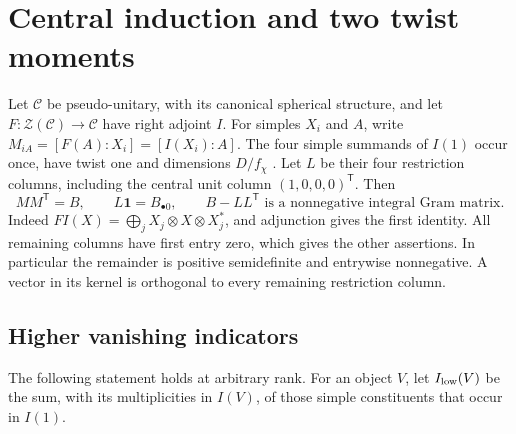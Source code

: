 \section{Central induction and two twist moments}\label{sec:finite-induction}
Let $\mathcal C$ be pseudo-unitary, with its canonical spherical structure,
and let $F:\mathcal Z(\mathcal C)\to\mathcal C$ have right adjoint $I$.
For simples $X_i$ and $A$, write
$M_{iA}=[F(A):X_i]=[I(X_i):A]$. The four simple summands of $I(1)$
occur once, have twist one and dimensions $D/f_\chi$
\cite[Theorems 2.5 and 2.13]{OstrikRank3}.
Let $L$ be their four restriction columns, including the central unit
column $(1,0,0,0)^{\mathsf T}$. Then
\begin{equation}\label{eq:induction-gram}
 MM^{\mathsf T}=B,\qquad
 L\mathbf1=B_{\bullet0},\qquad
 B-LL^{\mathsf T}\text{ is a nonnegative integral Gram matrix}.
\end{equation}
Indeed $FI(X)=\bigoplus_j X_j\otimes X\otimes X_j^*$, and adjunction
gives the first identity. All remaining columns have first entry zero,
which gives the other assertions. In particular the remainder is positive
semidefinite and entrywise nonnegative. A vector in its kernel is
orthogonal to every remaining restriction column.

\subsection{Higher vanishing indicators}
The following statement holds at arbitrary rank. For an object $V$, let
$I_{\rm low}(V)$ be the sum, with its multiplicities in $I(V)$, of those
simple constituents that occur in $I(1)$.

